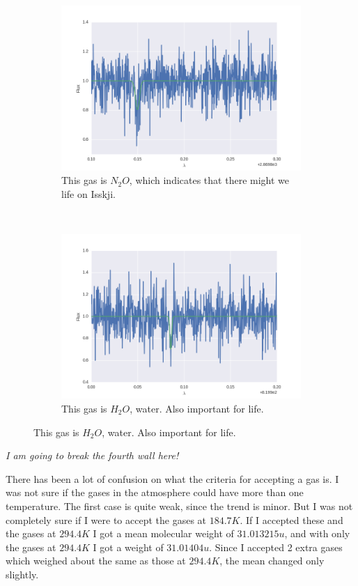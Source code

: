 \documentclass[a4paper, 10pt]{article}
\begin{document}
\begin{figure}[H]
\centering
\begin{subfigure}[t]{0.5\textwidth}
\centering
\includegraphics[width=\textwidth]{part6correct2870.png}
\caption{This gas is $N_2O$, which indicates that there might we life on Isskji.}
\end{subfigure}%
~
\begin{subfigure}[t]{0.5\textwidth}
\centering
\includegraphics[width=\textwidth]{part6correct820.png}
\caption{This gas is $H_2O$, water. Also important for life.}
\end{subfigure}%
\end{figure}


\textit{I am going to break the fourth wall here!}

There has been a lot of confusion on what the criteria for accepting a gas is. I was not sure if the gases in the atmosphere could have more than one temperature. The first case is quite weak, since the trend is minor. But I was not completely sure if I were to accept the gases at $184.7 K$. If I accepted these and the gases at $294.4 K$ I got a mean molecular weight of $31.013215 u$, and with only the gases at $294.4 K$ I got a weight of $31.01404 u$. Since I accepted 2 extra gases which weighed about the same as those at $294.4 K$, the mean changed only slightly. \\
\end{document}
